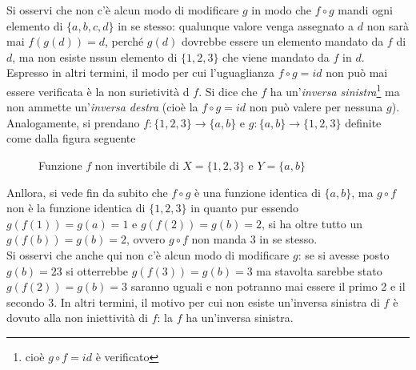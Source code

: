 Si osservi che non c'è alcun modo di modificare $g$ in modo che $f\circ g$ mandi ogni elemento di $\{a,b,c,d\}$ in
se stesso: qualunque valore venga assegnato a $d$ non sarà mai $f(g(d))=d$, perché $g(d)$ dovrebbe essere un elemento
mandato da $f$ di $d$, ma non esiste nssun elemento di $\{1,2,3\}$ che viene mandato da $f$ in $d$.\\
Espresso in altri termini, il modo per cui l'uguaglianza $f\circ g=id$ non può mai essere verificata è la non
surietività d $f$. Si dice che $f$ ha un'\textit{inversa sinistra}\footnote{cioè $g\circ f=id$ è verificato} ma non
ammette un'\textit{inversa destra} (cioè la $f\circ g=id$ non può valere per nessuna $g$). Analogamente, si prendano
$f:\{1,2,3\}\to \{a,b\}$ e $g:\{a,b\}\to \{1,2,3\}$ definite come dalla figura seguente
\begin{figure}[ht!]
  \centering
  \resizebox{15cm}{!}{}
  \caption{Funzione $f$ non invertibile di $X=\{1,2,3\}$ e $Y=\{a,b\}$}
\label{fig:Compinveeproddimatrici3}
\end{figure}

Anllora, si vede fin da subito che $f\circ g$ è una funzione identica di $\{a,b\}$, ma $g\circ f$ non è la funzione
identica di $\{1,2,3\}$ in quanto pur essendo $g(f(1))=g(a)=1$ e $g(f(2))=g(b)=2$, si ha oltre tutto un $g(f(b))=g(b)=2$,
ovvero $g\circ f$ non manda 3 in se stesso.\\
Si osservi che anche qui non c'è alcun modo di modificare $g$: se si avesse posto $g(b)=23$ si otterrebbe
$g(f(3))=g(b)=3$ ma stavolta sarebbe stato $g(f(2))=g(b)=3$ saranno uguali e non potranno mai essere il
primo 2 e il secondo 3. In altri termini, il motivo per cui non esiste un'inversa sinistra di $f$ è dovuto
alla non iniettività di $f$: la $f$ ha un'inversa sinistra.

